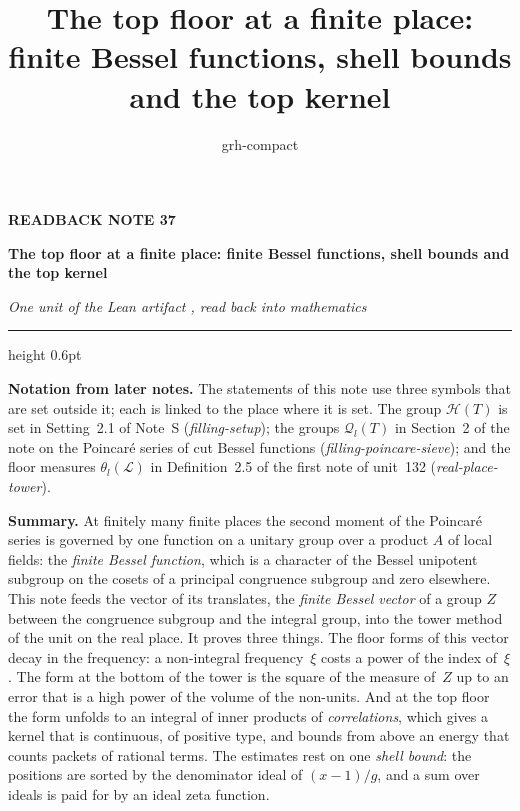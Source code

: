 \documentclass[11pt,a4paper]{article}
\title{The top floor at a finite place: finite Bessel functions, shell bounds and the top kernel}
\author{grh-compact}
\date{}
\theoremstyle{plainx}
\theoremstyle{uprightx}
\newcommand{\cL}{\mathcal{L}}                       %
\newcommand{\HT}[1]{\mathcal{H}(#1)}                %
\newcommand{\Ql}[2]{\mathcal{Q}_{#1}(#2)}           %
\newcommand{\flm}[2]{\theta_{#2}(#1)}               %
\begin{document}
\color{ink}

{\raggedright
{\sffamily\bfseries\fontsize{7.2}{9}\selectfont\color{leancol}READBACK NOTE 37\par}
\vspace{5pt}
{\fontsize{21.5}{25.5}\selectfont\bfseries The top floor at a finite place: finite Bessel functions, shell bounds and the top kernel\par}
\vspace{5pt}
{\fontsize{12.4}{16}\selectfont\itshape\color{inksoft} One unit of the Lean artifact \ArtifactName, read back into
mathematics\par}}
\vspace{8pt}
{\color{rulegrey}\hrule height 0.6pt}
\vspace{7pt}
\thispagestyle{empty}
\providecommand{\notelink}[3]{\href{https://nasqret.github.io/riemann-rev/writeup/browse/notes/#1.pdf\#nameddest=#2}{#3}}

\textbf{Notation from later notes.} The statements of this note use three symbols that are set outside it; each is
linked to the place where it is set. The group \notelink{filling-setup}{theorem.2.1}{$\HT{T}$} is set in Setting~2.1 of
Note~S (\emph{filling-setup}); the groups \notelink{filling-poincare-sieve}{section.2}{$\Ql{l}{T}$} in Section~2 of the
note on the Poincaré series of cut Bessel functions (\emph{filling-poincare-sieve}); and the floor measures
\notelink{real-place-tower}{theorem.2.5}{$\flm{\cL}{l}$} in Definition~2.5 of the first note of unit~132
(\emph{real-place-tower}).


\textbf{Summary.} At finitely many finite places the second moment of the Poincaré series is governed by one
function on a unitary group over a product $A$ of local fields: the \emph{finite Bessel function}, which is a
character of the Bessel unipotent subgroup on the cosets of a principal congruence subgroup and zero elsewhere.
This note feeds the vector of its translates, the \emph{finite Bessel vector} of a group $Z$ between the
congruence subgroup and the integral group, into the tower method of the unit on the real place. It proves three
things. The floor forms of this vector decay in the frequency: a non-integral frequency~$\xi$ costs a power of
the index of~$\xi$. The form at the bottom of the tower is the square of the measure of~$Z$ up to an error that is
a high power of the volume of the non-units. And at the top floor the form unfolds to an integral of inner
products of \emph{correlations}, which gives a kernel that is continuous, of positive type, and bounds from
above an energy that counts packets of rational terms. The estimates rest on one \emph{shell bound}: the
positions are sorted by the denominator ideal of $(x-1)/g$, and a sum over ideals is paid for by an ideal zeta
function.
\end{document}
